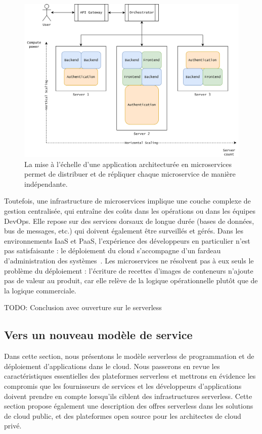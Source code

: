 \begin{figure}[ht]
    \centering
	\includegraphics[width=\textwidth]{3_Chapitre1/figures/scaling-microservices.png}
	\caption{La mise à l'échelle d'une application architecturée en microservices permet de distribuer et de répliquer chaque microservice de manière indépendante.}
	\label{fig:scaling-microservices}
\end{figure}

Toutefois, une infrastructure de microservices implique une couche complexe de gestion centralisée, qui entraîne des coûts dans les opérations ou dans les équipes DevOps. Elle repose sur des services dorsaux de longue durée (bases de données, bus de messages, etc.) qui doivent également être surveillés et gérés. Dans les environnements IaaS et PaaS, l'expérience des développeurs en particulier n'est pas satisfaisante : le déploiement du cloud s'accompagne d'un fardeau d'administration des systèmes~\cite{jonasCloudProgrammingSimplified2019}. Les microservices ne résolvent pas à eux seuls le problème du déploiement : l'écriture de recettes d'images de conteneurs n'ajoute pas de valeur au produit, car elle relève de la logique opérationnelle plutôt que de la logique commerciale.

TODO: Conclusion avec ouverture sur le serverless

\subsection{Vers un nouveau modèle de service}

Dans cette section, nous présentons le modèle serverless de programmation et de déploiement d'applications dans le cloud. Nous passerons en revue les caractéristiques essentielles des plateformes serverless et mettrons en évidence les compromis que les fournisseurs de services et les développeurs d'applications doivent prendre en compte lorsqu'ils ciblent des infrastructures serverless. Cette section propose également une description des offres serverless dans les solutions de cloud public, et des plateformes open source pour les architectes de cloud privé.

